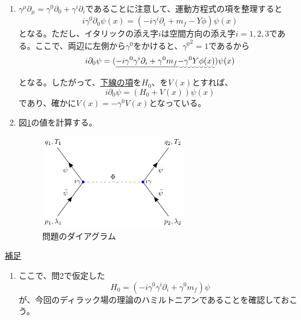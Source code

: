 \documentclass[unicode,a4paper,10pt]{ltjsarticle}
\begin{document}
\begin{enumerate}
  \item
        $\gamma^{\mu}\partial_{\mu}=\gamma^{0}\partial_{0}+\gamma^{i}\partial_{i}$であることに注意して、運動方程式の項を整理すると
        \begin{equation}
          i\gamma^{0}\partial_{0}\psi(x)
          =
          (-i\gamma^{i}\partial_{i}+m_{f}-Y\phi)\psi(x)
        \end{equation}
        となる。ただし、イタリックの添え字$i$は空間方向の添え字$i=1,2,3$である。ここで、両辺に左側から$\gamma^{0}$をかけると、${\gamma^{0}}^2=1$であるから
        \begin{equation}
          i\partial_{0}\psi
          =
          (
          \uline{-i\gamma^{0}\gamma^{i}\partial_{i}
          +
          \gamma^{0}m_{f}
          }
          \uwave{
            -
            \gamma^{0}Y\phi(x)
          }
          )\psi(x)
        \end{equation}
        となる。したがって、\uline{下線の項}を$H_{0}$、を$V(x)$とすれば、
        \begin{equation}
          i\partial_{0}\psi
          =
          (
          H_{0}
          +
          V(x)
          )\psi(x)
        \end{equation}
        であり、確かに$V(x)=-\gamma^{0}V(x)$となっている。


  \item
        図\ref{fig:feynman_diag01}の値を計算する。


        \begin{figure}[ht]
          \centering
          \includegraphics[width=0.6\textwidth]{fig/fig01.pdf}
          \caption{問題のダイアグラム}
          \label{fig:feynman_diag01}
        \end{figure}







\end{enumerate}


\clearpage
\uline{補足}
\begin{enumerate}
  \item
        ここで、問2で仮定した
        \begin{equation}
          H_{0}
          =
          (-i\gamma^{0}\gamma^{i}\partial_{i}+\gamma^{0}m_{f})\psi
        \end{equation}
        が、今回のディラック場の理論のハミルトニアンであることを確認しておこう。




\end{enumerate}

% 
% 
\end{document}
